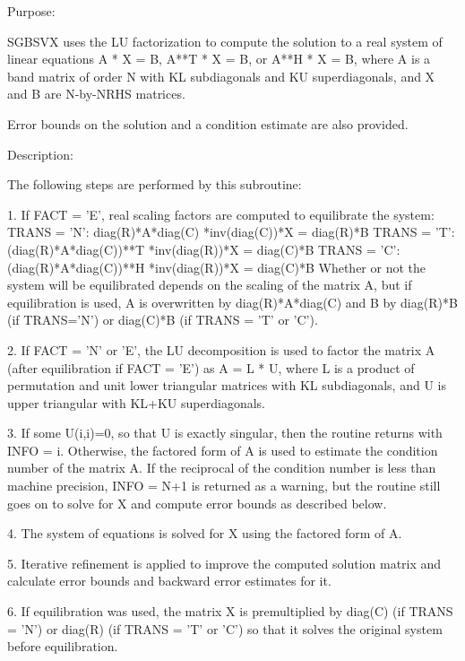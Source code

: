  \begin{DoxyParagraph}{Purpose\+: }
\begin{DoxyVerb} SGBSVX uses the LU factorization to compute the solution to a real
 system of linear equations A * X = B, A**T * X = B, or A**H * X = B,
 where A is a band matrix of order N with KL subdiagonals and KU
 superdiagonals, and X and B are N-by-NRHS matrices.

 Error bounds on the solution and a condition estimate are also
 provided.\end{DoxyVerb}
 
\end{DoxyParagraph}
\begin{DoxyParagraph}{Description\+: }
\begin{DoxyVerb} The following steps are performed by this subroutine:

 1. If FACT = 'E', real scaling factors are computed to equilibrate
    the system:
       TRANS = 'N':  diag(R)*A*diag(C)     *inv(diag(C))*X = diag(R)*B
       TRANS = 'T': (diag(R)*A*diag(C))**T *inv(diag(R))*X = diag(C)*B
       TRANS = 'C': (diag(R)*A*diag(C))**H *inv(diag(R))*X = diag(C)*B
    Whether or not the system will be equilibrated depends on the
    scaling of the matrix A, but if equilibration is used, A is
    overwritten by diag(R)*A*diag(C) and B by diag(R)*B (if TRANS='N')
    or diag(C)*B (if TRANS = 'T' or 'C').

 2. If FACT = 'N' or 'E', the LU decomposition is used to factor the
    matrix A (after equilibration if FACT = 'E') as
       A = L * U,
    where L is a product of permutation and unit lower triangular
    matrices with KL subdiagonals, and U is upper triangular with
    KL+KU superdiagonals.

 3. If some U(i,i)=0, so that U is exactly singular, then the routine
    returns with INFO = i. Otherwise, the factored form of A is used
    to estimate the condition number of the matrix A.  If the
    reciprocal of the condition number is less than machine precision,
    INFO = N+1 is returned as a warning, but the routine still goes on
    to solve for X and compute error bounds as described below.

 4. The system of equations is solved for X using the factored form
    of A.

 5. Iterative refinement is applied to improve the computed solution
    matrix and calculate error bounds and backward error estimates
    for it.

 6. If equilibration was used, the matrix X is premultiplied by
    diag(C) (if TRANS = 'N') or diag(R) (if TRANS = 'T' or 'C') so
    that it solves the original system before equilibration.\end{DoxyVerb}
 
\end{DoxyParagraph}

